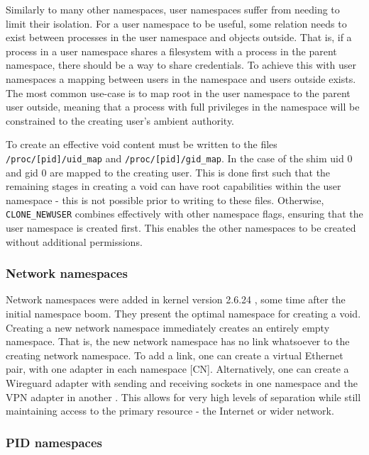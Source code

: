 \documentclass[sigplan]{acmart}
\begin{document}
Similarly to many other namespaces, user namespaces suffer from needing to limit their isolation. For a user namespace to be useful, some relation needs to exist between processes in the user namespace and objects outside. That is, if a process in a user namespace shares a filesystem with a process in the parent namespace, there should be a way to share credentials. To achieve this with user namespaces a mapping between users in the namespace and users outside exists. The most common use-case is to map root in the user namespace to the parent user outside, meaning that a process with full privileges in the namespace will be constrained to the creating user's ambient authority.

To create an effective void content must be written to the files \texttt{/proc/[pid]/uid\_map} and \texttt{/proc/[pid]/gid\_map}. In the case of the shim uid 0 and gid 0 are mapped to the creating user. This is done first such that the remaining stages in creating a void can have root capabilities within the user namespace - this is not possible prior to writing to these files. Otherwise, \texttt{CLONE\_NEWUSER} combines effectively with other namespace flags, ensuring that the user namespace is created first. This enables the other namespaces to be created without additional permissions.

\subsubsection{Network namespaces}

Network namespaces were added in kernel version 2.6.24 \citep{noauthor_linux_2008}, some time after the initial namespace boom. They present the optimal namespace for creating a void. Creating a new network namespace immediately creates an entirely empty namespace. That is, the new network namespace has no link whatsoever to the creating network namespace. To add a link, one can create a virtual Ethernet pair, with one adapter in each namespace [CN]. Alternatively, one can create a Wireguard adapter with sending and receiving sockets in one namespace and the VPN adapter in another \citep[§7.3]{donenfeld_wireguard_2017}. This allows for very high levels of separation while still maintaining access to the primary resource - the Internet or wider network.

\subsubsection{PID namespaces}
\end{document}

